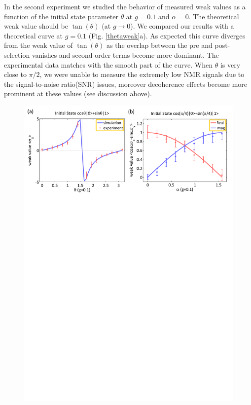 \documentclass[aps,pra,12pt,onecolumn,showpacs,superscriptaddress,floatfix,footinbib,subfigure]{revtex4}
\begin{document}
In the second experiment  we studied  the behavior of measured weak values as a function of the initial state parameter $\theta$ at $g=0.1$ and $\alpha=0$. The theoretical weak value should be  $\tan(\theta)$ (at $g\rightarrow0$). We compared our results with a theoretical curve at $g=0.1$  (Fig. \ref{thetaweak}a). As expected this curve diverges from the weak value of $\tan(\theta)$ as the overlap between the pre and post-selection vanishes   and second order terms become more dominant. The experimental data matches with the smooth part of the curve. When $\theta$ is very close to  $\pi/2$, we were unable to measure the extremely low NMR signals  due to the signal-to-noise ratio(SNR) issues, moreover decoherence effects become more prominent at these values (see discussion above).

\begin{figure}[h] \centering
\includegraphics[width=\columnwidth]{thetaweak.pdf}

\end{figure}
\end{document}
